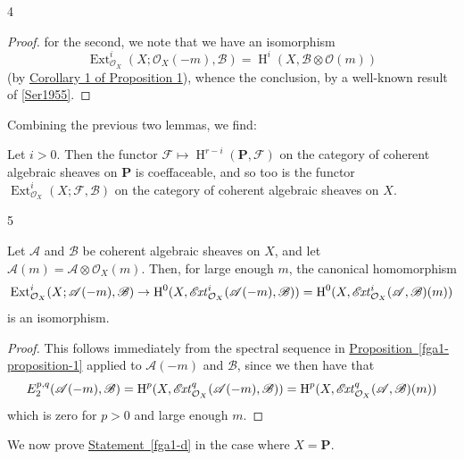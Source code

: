 \begin{lemma}{4}
\begin{proof}
      for the second, we note that we have an isomorphism
      \[         \operatorname {Ext}_{\mathcal {O}_X}^i(X;\mathcal {O}_X(-m),\mathscr {B})         = \operatorname {H}^i(X,\mathscr {B}\otimes \mathcal {O}(m))       \]
      (by \hyperref[fga1-proposition-1-corollary-1]{Corollary 1 of Proposition 1}), whence the conclusion, by a well-known result of \hyperref[Ser1955]{[Ser1955]}.\end{proof}\end{lemma}\par{}Combining the previous two lemmas, we find:\begin{corollary}{}\label{fga1-lemma-3-and-4-corollary}\skipsinglepar\par{}Let \(i>0\).
    Then the functor \(\mathscr {F}\mapsto \operatorname {H}^{r-i}(\mathbf {P},\mathscr {F})\) on the category of coherent algebraic sheaves on \(\mathbf {P}\) is coeffaceable, and so too is the functor \(\operatorname {Ext}_{\mathcal {O}_X}^i(X;\mathscr {F},\mathscr {B})\) on the category of coherent algebraic sheaves on \(X\).\end{corollary}\begin{lemma}{5}\label{fga1-lemma-5}\skipsinglepar\par{}Let \(\mathscr {A}\) and \(\mathscr {B}\) be coherent algebraic sheaves on \(X\), and let \(\mathscr {A}(m)=\mathscr {A}\otimes \mathcal {O}_X(m)\).
    Then, for large enough \(m\), the canonical homomorphism
    \[       \operatorname {Ext}_{\mathcal {O}_X}^i(X;\mathscr {A}(-m),\mathscr {B})       \to  \operatorname {H}^0(X,\mathscr {E}\kern  -1.5pt\mathit {xt}_{\mathcal {O}_X}^i(\mathscr {A}(-m),\mathscr {B}))       = \operatorname {H}^0(X,\mathscr {E}\kern  -1.5pt\mathit {xt}_{\mathcal {O}_X}^i(\mathscr {A},\mathscr {B})(m))     \]
    is an isomorphism.\begin{proof}\par{}This follows immediately from the spectral sequence in \hyperref[fga1-proposition-1]{Proposition~\ref*{fga1-proposition-1}} applied to \(\mathscr {A}(-m)\) and \(\mathscr {B}\), since we then have that
      \[         E_2^{p,q}(\mathscr {A}(-m),\mathscr {B})         = \operatorname {H}^p(X,\mathscr {E}\kern  -1.5pt\mathit {xt}_{\mathcal {O}_X}^q(\mathscr {A}(-m),\mathscr {B}))         = \operatorname {H}^p(X,\mathscr {E}\kern  -1.5pt\mathit {xt}_{\mathcal {O}_X}^q(\mathscr {A},\mathscr {B})(m))       \]
      which is zero for \(p>0\) and large enough \(m\).\end{proof}\end{lemma}\par{}We now prove \hyperref[fga1-d]{Statement~\ref*{fga1-d}} in the case where \(X=\mathbf {P}\).
